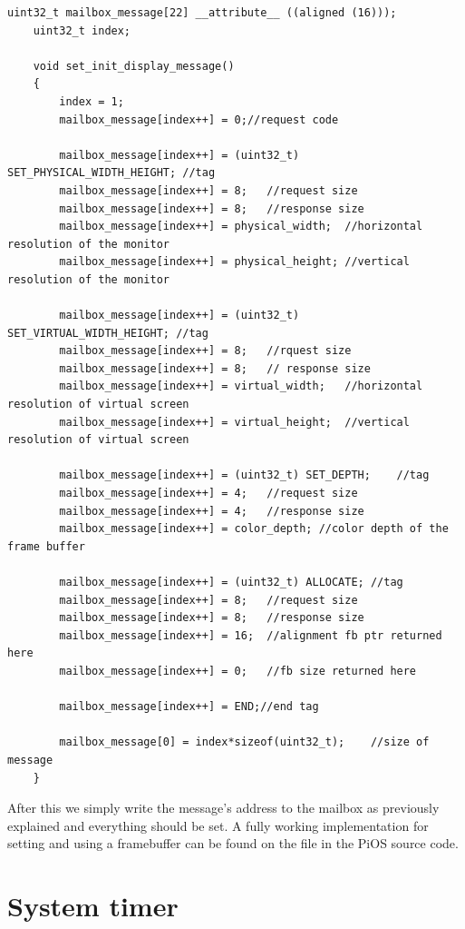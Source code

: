 \documentclass[12pt, svgnames]{book}
\begin{document}
\begin{lstlisting}[style =C]
	uint32_t mailbox_message[22] __attribute__ ((aligned (16)));
	uint32_t index;
	
	void set_init_display_message()
	{
		index = 1;
		mailbox_message[index++] = 0;//request code
		
		mailbox_message[index++] = (uint32_t) SET_PHYSICAL_WIDTH_HEIGHT; //tag
		mailbox_message[index++] = 8;	//request size
		mailbox_message[index++] = 8;	//response size
		mailbox_message[index++] = physical_width;	//horizontal resolution of the monitor
		mailbox_message[index++] = physical_height;	//vertical resolution of the monitor
		
		mailbox_message[index++] = (uint32_t) SET_VIRTUAL_WIDTH_HEIGHT;	//tag
		mailbox_message[index++] = 8;	//rquest size
		mailbox_message[index++] = 8;	// response size
		mailbox_message[index++] = virtual_width;	//horizontal resolution of virtual screen
		mailbox_message[index++] = virtual_height;	//vertical resolution of virtual screen
		
		mailbox_message[index++] = (uint32_t) SET_DEPTH;	//tag
		mailbox_message[index++] = 4;	//request size
		mailbox_message[index++] = 4;	//response size
		mailbox_message[index++] = color_depth;	//color depth of the frame buffer
		
		mailbox_message[index++] = (uint32_t) ALLOCATE;	//tag
		mailbox_message[index++] = 8;	//request size
		mailbox_message[index++] = 8;	//response size
		mailbox_message[index++] = 16;	//alignment fb ptr returned here
		mailbox_message[index++] = 0;	//fb size returned here
		
		mailbox_message[index++] = END;//end tag
		
		mailbox_message[0] = index*sizeof(uint32_t);	//size of message
	}
\end{lstlisting}

After this we simply write the message's address to the mailbox as previously explained and everything should be set. A fully working implementation for setting and using a framebuffer can be found on the \href{https://github.com/Makogan/PiOS/blob/master/source/Hardware/Graphics/mailbox.cpp}{} file in the PiOS source code.

\section{System timer}
\end{document}
